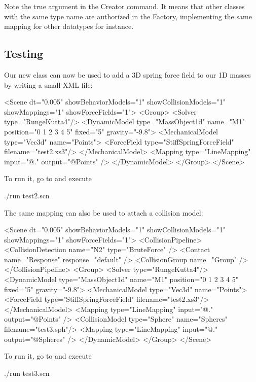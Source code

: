 Note the true argument in the Creator command. It means that other classes with the same type name are authorized in the Factory, implementing the same mapping for other datatypes for instance.

\subsection{Testing}

Our new class can now be used to add a 3D spring force field to our 1D masses by writing a small XML file:

\begin{code_xml}
<Scene dt="0.005" showBehaviorModels="1" showCollisionModels="1" showMappings="1" showForceFields="1">
	<Group>
		<Solver type="RungeKutta4"/>
		<DynamicModel type="MassObject1d" name="M1" position="0 1 2 3 4 5" fixed="5" gravity="-9.8">
		<MechanicalModel type="Vec3d" name="Points">
		<ForceField type="StiffSpringForceField" filename="test2.xs3"/>
		</MechanicalModel>
		<Mapping type="LineMapping" input="@." output="@Points" />
		</DynamicModel>
	</Group>
</Scene>
\end{code_xml}

To run it, go to  and execute
\begin{code_bash}
./run test2.scn
\end{code_bash}

The same mapping can also be used to attach a collision model:

\begin{code_xml}
<Scene dt="0.005" showBehaviorModels="1" showCollisionModels="1" showMappings="1" showForceFields="1">
	<CollisionPipeline>
		<CollisionDetection name="N2" type="BruteForce" />
		<Contact name="Response" response="default" />
		<CollisionGroup name="Group" />
	</CollisionPipeline>
	<Group>
		<Solver type="RungeKutta4"/>
		<DynamicModel type="MassObject1d" name="M1" position="0 1 2 3 4 5" fixed="5" gravity="-9.8">
		<MechanicalModel type="Vec3d" name="Points">
		<ForceField type="StiffSpringForceField" filename="test2.xs3"/>
		</MechanicalModel>
		<Mapping type="LineMapping" input="@." output="@Points" />
		<CollisionModel type="Sphere" name="Spheres" filename="test3.sph"/>
		<Mapping type="LineMapping" input="@." output="@Spheres" />
		</DynamicModel>
	</Group>
</Scene>
\end{code_xml}

To run it, go to  and execute
\begin{code_bash}
./run test3.scn
\end{code_bash}


